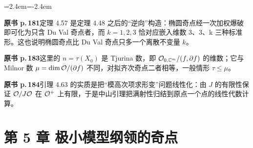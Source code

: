 \begin{list}{}{\leftmargin=2.4em\itemindent=-2.4em\itemsep=2pt\parsep=0pt}
\item \textbf{原书 p.\,181}\quad 定理 4.57 是定理 4.48 之后的“逆向”构造：椭圆奇点经一次加权爆破即可化为只含 Du Val 奇点者，而 $k=1,2,3$ 恰对应嵌入维数 3、3、k 三种标准形。这也说明椭圆奇点比 Du Val 奇点只多一个离散不变量 $k$。
\item \textbf{原书 p.\,183}\quad 这里的 $n=\tau(X_0)$ 是 Tjurina 数，即 $\mathcal{O}_{0,\mathbb{C}^m}/(f,\partial f)$ 的维数；它与 Milnor 数 $\mu=\dim\mathcal{O}/(\partial f)$ 不同，对拟齐次奇点二者相等，一般情形 $\tau\le\mu$。
\item \textbf{原书 p.\,184}\quad 引理 4.63 的实质是把“模高次项求形变”问题线性化：由 $J$ 的有限性保证 $\mathcal{O}/J\mathcal{O}$ 在 $\mathcal{O}^+$ 上有限，于是中山引理把满射性归结到原点一个点的线性代数计算。
\end{list}

\section*{第 5 章 极小模型纲领的奇点}
